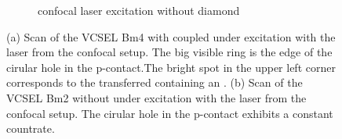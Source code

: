 	\begin{figure}[tp]
		\begin{subfigure}[t]{ 0.49\linewidth}
			\centering
			\caption{}
			\label{subfig::vcsel_confocal_laser_excitation_with_diamond}
		\end{subfigure}
		\hfill
		\begin{subfigure}[t]{ 0.49\linewidth}
			\centering
			\caption{confocal laser excitation without diamond}
			\label{subfig::confocal_laser_excitation_without_diamond}
		\end{subfigure}
		\caption{(a) Scan of the VCSEL Bm4 with coupled \nd under excitation with the laser from the confocal setup. The big visible ring is the edge of the cirular hole in the p-contact.The bright spot in the upper left corner corresponds to the transferred \nd containing an \siv. (b) Scan of the VCSEL Bm2 without \nd under excitation with the laser from the confocal setup. The cirular hole in the p-contact exhibits a constant countrate.}
	\end{figure}

